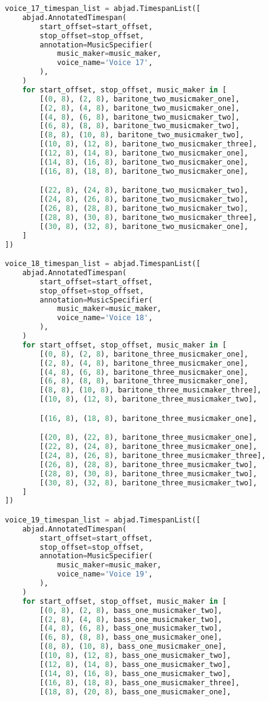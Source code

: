 \begin{lstlisting}[language=Python, caption=Invocation Source Code]
voice_17_timespan_list = abjad.TimespanList([
    abjad.AnnotatedTimespan(
        start_offset=start_offset,
        stop_offset=stop_offset,
        annotation=MusicSpecifier(
            music_maker=music_maker,
            voice_name='Voice 17',
        ),
    )
    for start_offset, stop_offset, music_maker in [
        [(0, 8), (2, 8), baritone_two_musicmaker_one],
        [(2, 8), (4, 8), baritone_two_musicmaker_one],
        [(4, 8), (6, 8), baritone_two_musicmaker_two],
        [(6, 8), (8, 8), baritone_two_musicmaker_two],
        [(8, 8), (10, 8), baritone_two_musicmaker_two],
        [(10, 8), (12, 8), baritone_two_musicmaker_three],
        [(12, 8), (14, 8), baritone_two_musicmaker_one],
        [(14, 8), (16, 8), baritone_two_musicmaker_one],
        [(16, 8), (18, 8), baritone_two_musicmaker_one],

        [(22, 8), (24, 8), baritone_two_musicmaker_two],
        [(24, 8), (26, 8), baritone_two_musicmaker_two],
        [(26, 8), (28, 8), baritone_two_musicmaker_two],
        [(28, 8), (30, 8), baritone_two_musicmaker_three],
        [(30, 8), (32, 8), baritone_two_musicmaker_one],
    ]
])

voice_18_timespan_list = abjad.TimespanList([
    abjad.AnnotatedTimespan(
        start_offset=start_offset,
        stop_offset=stop_offset,
        annotation=MusicSpecifier(
            music_maker=music_maker,
            voice_name='Voice 18',
        ),
    )
    for start_offset, stop_offset, music_maker in [
        [(0, 8), (2, 8), baritone_three_musicmaker_one],
        [(2, 8), (4, 8), baritone_three_musicmaker_one],
        [(4, 8), (6, 8), baritone_three_musicmaker_one],
        [(6, 8), (8, 8), baritone_three_musicmaker_one],
        [(8, 8), (10, 8), baritone_three_musicmaker_three],
        [(10, 8), (12, 8), baritone_three_musicmaker_two],

        [(16, 8), (18, 8), baritone_three_musicmaker_one],

        [(20, 8), (22, 8), baritone_three_musicmaker_one],
        [(22, 8), (24, 8), baritone_three_musicmaker_one],
        [(24, 8), (26, 8), baritone_three_musicmaker_three],
        [(26, 8), (28, 8), baritone_three_musicmaker_two],
        [(28, 8), (30, 8), baritone_three_musicmaker_two],
        [(30, 8), (32, 8), baritone_three_musicmaker_two],
    ]
])

voice_19_timespan_list = abjad.TimespanList([
    abjad.AnnotatedTimespan(
        start_offset=start_offset,
        stop_offset=stop_offset,
        annotation=MusicSpecifier(
            music_maker=music_maker,
            voice_name='Voice 19',
        ),
    )
    for start_offset, stop_offset, music_maker in [
        [(0, 8), (2, 8), bass_one_musicmaker_two],
        [(2, 8), (4, 8), bass_one_musicmaker_two],
        [(4, 8), (6, 8), bass_one_musicmaker_two],
        [(6, 8), (8, 8), bass_one_musicmaker_one],
        [(8, 8), (10, 8), bass_one_musicmaker_one],
        [(10, 8), (12, 8), bass_one_musicmaker_two],
        [(12, 8), (14, 8), bass_one_musicmaker_two],
        [(14, 8), (16, 8), bass_one_musicmaker_two],
        [(16, 8), (18, 8), bass_one_musicmaker_three],
        [(18, 8), (20, 8), bass_one_musicmaker_one],


\end{lstlisting}
